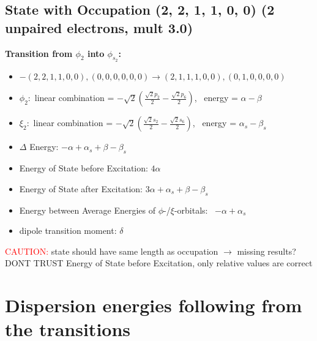\documentclass[12pt,a4paper]{article}
\begin{document}
\subsection*{State with Occupation (2, 2, 1, 1, 0, 0) (2 unpaired electrons, mult 3.0)}
        \noindent\textbf{Transition from $\phi_{2}$ into $\phi_{s_{2}}$:}
        \begin{itemize}
            \item $- (2, 2, 1, 1, 0, 0), (0, 0, 0, 0, 0, 0) \rightarrow (2, 1, 1, 1, 0, 0), (0, 1, 0, 0, 0, 0)$
        
            \item $\phi_{2}:$ linear combination = $- \sqrt{2} \left(\frac{\sqrt{2} p_{2}}{2} - \frac{\sqrt{2} p_{6}}{2}\right)$, \
            energy = $\alpha - \beta$
            
            \item $\xi_{2}:$ linear combination = $- \sqrt{2} \left(\frac{\sqrt{2} s_{2}}{2} - \frac{\sqrt{2} s_{6}}{2}\right)$, \
            energy = $\alpha_{s} - \beta_{s}$
            
            \item $\Delta$ Energy: $- \alpha + \alpha_{s} + \beta - \beta_{s}$
            \item Energy of State before Excitation: $4 \alpha$
            \item Energy of State after Excitation: $3 \alpha + \alpha_{s} + \beta - \beta_{s}$
            \item Energy between Average Energies of $\phi$-/$\xi$-orbitals: \
            $- \alpha + \alpha_{s}$
        
            \item dipole transition moment: $\delta$
        
        \end{itemize}
        
	\textcolor{red}{CAUTION:} state should have same length as occupation $\rightarrow$ missing results?
	DONT TRUST \glqq{}Energy of State before Excitation\grqq{}, only relative values are correct

\newpage \section*{Dispersion energies following from the transitions}
\end{document}
